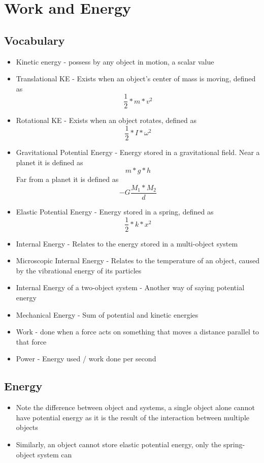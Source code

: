 \section{Work and Energy}

\subsection{Vocabulary}
\begin{itemize}
    \item Kinetic energy - possess by any object in motion, a scalar value
    \item Translational KE - Exists when an object's center of mass is moving, defined as \[\frac{1}{2}*m*v^2\]
    \item Rotational KE - Exists when an object rotates, defined as \[\frac{1}{2}*I*\omega^2\]
    \item Gravitational Potential Energy - Energy stored in a gravitational field. Near a planet it is defined as \[m*g*h\]
    Far from a planet it is defined as \[-G\frac{M_1*M_2}{d}\]
    \item Elastic Potential Energy - Energy stored in a spring, defined as \[\frac{1}{2}*k*x^2\]
    \item Internal Energy - Relates to the energy stored in a multi-object system
    \item Microscopic Internal Energy - Relates to the temperature of an object, caused by the vibrational energy of its particles
    \item Internal Energy of a two-object system - Another way of saying potential energy
    \item Mechanical Energy - Sum of potential and kinetic energies
    \item Work - done when a force acts on something that moves a distance parallel to that force
    \item Power - Energy used / work done per second
\end{itemize}

\subsection{Energy}
\begin{itemize}
    \item Note the difference between object and systems, a single object alone cannot have potential energy as it is the result of the interaction between multiple objects
    \item Similarly, an object cannot store elastic potential energy, only the spring-object system can
\end{itemize}

